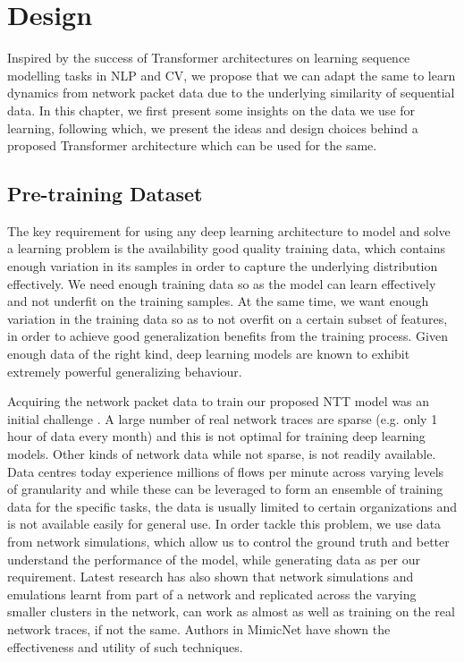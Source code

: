 \chapter{Design}
\label{cha:design}

Inspired by the success of Transformer architectures on learning sequence modelling tasks in NLP and CV, we propose that we can adapt the same to learn dynamics from network packet data due to the underlying similarity of sequential data. In this chapter, we first present some insights on the data we use for learning, following which, we present the ideas and design choices behind a proposed Transformer architecture which can be used for the same.

\section{Pre-training Dataset}
\label{sec:ns3}
The key requirement for using any deep learning architecture to model and solve a learning problem is the availability good quality training data, which contains enough variation in its  samples in order to capture the underlying distribution effectively. We need enough training data so as the model can learn effectively and not underfit on the training samples. At the same time, we want enough variation in the training data so as to not overfit on a certain subset of features, in order to achieve good generalization benefits from the training process. Given enough data of the right kind, deep learning models are known to exhibit extremely powerful generalizing behaviour\cite{generalizingdnn}.

Acquiring the network packet data to train our proposed NTT model was an initial challenge . A large number of real network traces are sparse (e.g. only 1 hour of data every month) and this is not optimal for training deep learning models. Other kinds of network data while not sparse, is not readily available. Data centres today experience millions of flows per minute across varying levels of granularity and while these can be leveraged to form an ensemble of training data for the specific tasks, the data is usually limited to certain organizations and is not available easily for general use. In order tackle this problem, we use data from network simulations, which allow us to control the ground truth and better understand the performance of the model, while generating data as per our requirement. Latest research has also shown that network simulations and emulations learnt from part of a network and replicated across the varying smaller clusters in the network, can work as almost as well as training on the real network traces, if not the same. Authors in MimicNet\cite{zhangMimicNetFastPerformance2021} have shown the effectiveness and utility of such techniques.

